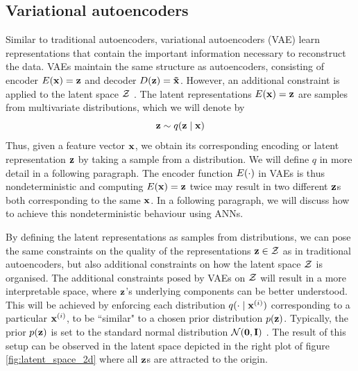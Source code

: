 \subsection{Variational autoencoders} \label{cha:bg_vae}

Similar to traditional autoencoders, variational autoencoders (VAE) learn representations that contain the important information necessary to reconstruct the data. VAEs maintain the same structure as autoencoders, consisting of encoder $E(\mathbf{x}) = \mathbf{z}$ and decoder $D(\mathbf{z}) = \mathbf{\tilde{x}}$. However, an additional constraint is applied to the latent space $\mathcal{Z}$ \citep{doerschTutorialVariationalAutoencoders2021, davidfosterVariationalAutoencoders2023, kingmaAutoEncodingVariationalBayes2022, kingmaIntroductionVariationalAutoencoders2019, cinelliVariationalMethodsMachine2021}. The latent representations $E(\mathbf{x}) = \mathbf{z}$ are samples from multivariate distributions, which we will denote by 
$$\mathbf{z} \sim q (\mathbf{z} \mid \mathbf{x})$$
Thus, given a feature vector $\mathbf{x}$, we obtain its corresponding encoding or latent representation $\mathbf{z}$ by taking a sample from a distribution. We will define $q$ in more detail in a following paragraph. The encoder function $E(\cdot)$ in VAEs is thus nondeterministic and computing $E(\mathbf{x}) = \mathbf{z}$ twice may result in two different $\mathbf{z}$s both corresponding to the same $\mathbf{x}$. In a following paragraph, we will discuss how to achieve this nondeterministic behaviour using ANNs.

By defining the latent representations as samples from distributions, we can pose the same constraints on the quality of the representations $\mathbf{z} \in \mathcal{Z}$ as in traditional autoencoders, but also additional constraints on how the latent space $\mathcal{Z}$ is organised. The additional constraints posed by VAEs on $\mathcal{Z}$ will result in a more interpretable space, where $\mathbf{z}$'s underlying components can be better understood. This will be achieved by enforcing each distribution $q ( \cdot \mid \mathbf{x}^{(i)})$ corresponding to a particular $\mathbf{x}^{(i)}$, to be ``similar" to a chosen prior distribution $p(\mathbf{z})$. Typically, the prior $p(\mathbf{z})$ is set to the standard normal distribution $\mathcal{N}(\bm{\mathbf{0}}, \mathbf{I})$ \citep{davidfosterVariationalAutoencoders2023}. The result of this setup can be observed in the latent space depicted in the right plot of figure \ref{fig:latent_space_2d} where all $\mathbf{z}$s are attracted to the origin.

